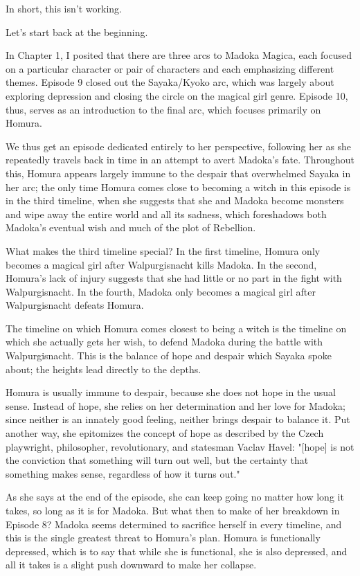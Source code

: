 In short, this isn't working.

Let's start back at the beginning.

In Chapter 1, I posited that there are three arcs to Madoka Magica, each focused on a particular character or pair of characters and each emphasizing different themes. Episode 9 closed out the Sayaka/Kyoko arc, which was largely about exploring depression and closing the circle on the magical girl genre. Episode 10, thus, serves as an introduction to the final arc, which focuses primarily on Homura.

We thus get an episode dedicated entirely to her perspective, following her as she repeatedly travels back in time in an attempt to avert Madoka's fate. Throughout this, Homura appears largely immune to the despair that overwhelmed Sayaka in her arc; the only time Homura comes close to becoming a witch in this episode is in the third timeline, when she suggests that she and Madoka become monsters and wipe away the entire world and all its sadness, which foreshadows both Madoka's eventual wish and much of the plot of Rebellion.

What makes the third timeline special? In the first timeline, Homura only becomes a magical girl after Walpurgisnacht kills Madoka. In the second, Homura's lack of injury suggests that she had little or no part in the fight with Walpurgisnacht. In the fourth, Madoka only becomes a magical girl after Walpurgisnacht defeats Homura.

The timeline on which Homura comes closest to being a witch is the timeline on which she actually gets her wish, to defend Madoka during the battle with Walpurgisnacht. This is the balance of hope and despair which Sayaka spoke about; the heights lead directly to the depths.

Homura is usually immune to despair, because she does not hope in the usual sense. Instead of hope, she relies on her determination and her love for Madoka; since neither is an innately good feeling, neither brings despair to balance it. Put another way, she epitomizes the concept of hope as described by the Czech playwright, philosopher, revolutionary, and statesman Vaclav Havel: "[hope] is not the conviction that something will turn out well, but the certainty that something makes sense, regardless of how it turns out." \cite{ref77} 

As she says at the end of the episode, she can keep going no matter how long it takes, so long as it is for Madoka. But what then to make of her breakdown in Episode 8? Madoka seems determined to sacrifice herself in every timeline, and this is the single greatest threat to Homura's plan. Homura is functionally depressed, which is to say that while she is functional, she is also depressed, and all it takes is a slight push downward to make her collapse.

